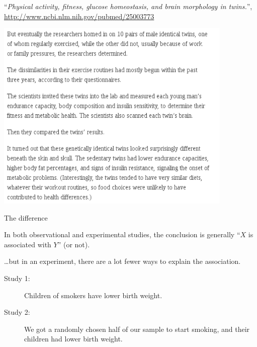 %
\begin{frame}{}


  {\small
  ``\emph{Physical activity, fitness, glucose homeostasis, and brain morphology in twins.}'', 
  \url{http://www.ncbi.nlm.nih.gov/pubmed/25003773}
  }
  \begin{center}
    \includegraphics[width=0.85\textwidth]{examples/twins-exercise_news}
  \end{center}
  \flushright\small{}


\end{frame}

%
\begin{frame}{The difference}

  In \alert{both} observational and experimental studies,
  the conclusion is generally ``$X$ is associated with $Y$'' (or not).

  \vspace{2em}

  \ldots but in an \alert{experiment},
  there are a lot fewer ways to explain the association.

  \vspace{2em}

  \begin{description}
      \item[Study 1:] Children of smokers have lower birth weight.
        \pause
      \item[Study 2:] We got a randomly chosen half of our sample to start smoking,
          and their children had lower birth weight.
  \end{description}

\end{frame}


